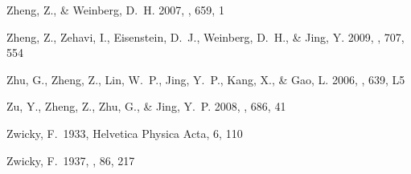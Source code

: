 \documentclass[]{emulateapj}
\begin{document}
\begin{thebibliography}{999}
Zheng, Z., \& Weinberg, D.\ H. 2007, \apj, 659, 1

Zheng, Z., Zehavi, I., Eisenstein, D.\ J., Weinberg, D.\ H., \& Jing, Y. 2009,
\apj, 707, 554 

Zhu, G., Zheng, Z., Lin, W.\ P., Jing, Y.\ P., Kang, X., \& Gao, L. 2006, 
\apj, 639, L5 

Zu, Y., Zheng, Z., Zhu, G., \& Jing, Y.\ P. 2008,
\apj, 686, 41

Zwicky, F.\ 1933, Helvetica Physica Acta, 6, 110

Zwicky, F.\ 1937, \apj, 86, 217


\end{thebibliography}
\end{document}
